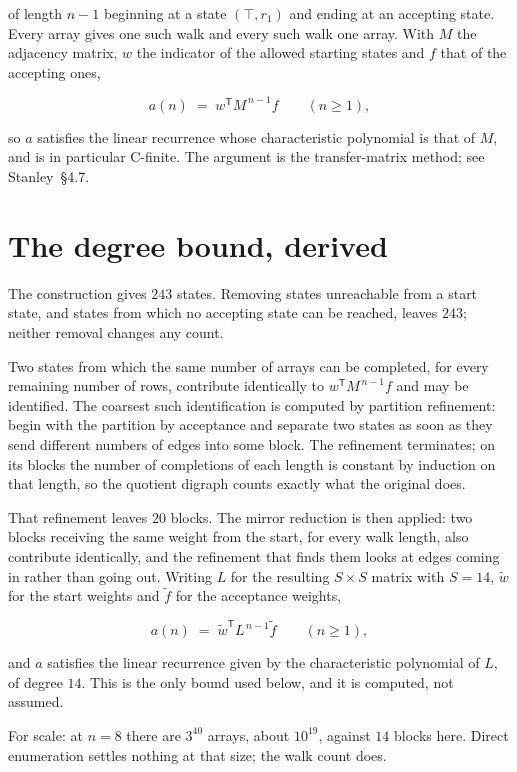 \documentclass[11pt]{article}
\theoremstyle{definition}
\begin{document}
of length $n-1$ beginning at a state $(\top,r_1)$ and ending at an accepting state. Every array gives one such walk and every such walk one array. With $M$ the adjacency matrix, $w$ the indicator of the allowed starting states and $f$ that of the accepting ones,

\[a(n) \;=\; w^{\mathsf T} M^{\,n-1} f \qquad (n \ge 1),\]

so $a$ satisfies the linear recurrence whose characteristic polynomial is that of $M$, and is in particular C-finite. The argument is the transfer-matrix method; see Stanley~\S4.7.

\section{The degree bound, derived}

The construction gives $243$ states. Removing states unreachable from a start state, and states from which no accepting state can be reached, leaves $243$; neither removal changes any count.

Two states from which the same number of arrays can be completed, for every remaining number of rows, contribute identically to $w^{\mathsf T}M^{\,n-1}f$ and may be identified. The coarsest such identification is computed by partition refinement: begin with the partition by acceptance and separate two states as soon as they send different numbers of edges into some block. The refinement terminates; on its blocks the number of completions of each length is constant by induction on that length, so the quotient digraph counts exactly what the original does.

That refinement leaves $20$ blocks. The mirror reduction is then applied: two blocks receiving the same weight from the start, for every walk length, also contribute identically, and the refinement that finds them looks at edges coming in rather than going out. Writing $L$ for the resulting $S \times S$ matrix with $S = 14$, $\tilde w$ for the start weights and $\tilde f$ for the acceptance weights,

\[a(n) \;=\; \tilde w^{\mathsf T} L^{\,n-1} \tilde f \qquad (n \ge 1),\]

and $a$ satisfies the linear recurrence given by the characteristic polynomial of $L$, of degree $14$. This is the only bound used below, and it is computed, not assumed.

For scale: at $n = 8$ there are $3^{40}$ arrays, about $10^{19}$, against $14$ blocks here. Direct enumeration settles nothing at that size; the walk count does.
\end{document}
